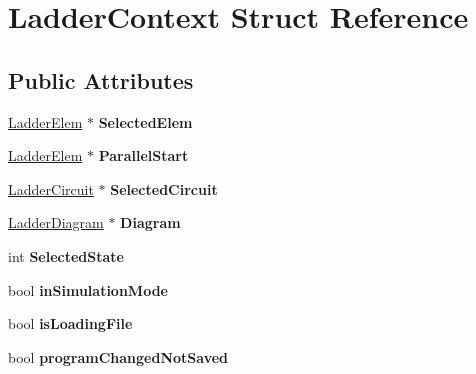 \hypertarget{struct_ladder_context}{\section{Ladder\-Context Struct Reference}
\label{struct_ladder_context}
}
\subsection*{Public Attributes}
\begin{DoxyCompactItemize}
\item 
\hypertarget{struct_ladder_context_a0cd153c6cd68ec58538fe16aa755a4d7}{\hyperlink{class_ladder_elem}{Ladder\-Elem} $\ast$ {\bfseries Selected\-Elem}}\label{struct_ladder_context_a0cd153c6cd68ec58538fe16aa755a4d7}

\item 
\hypertarget{struct_ladder_context_adc0388c67ea4f9faf3763beab150bb66}{\hyperlink{class_ladder_elem}{Ladder\-Elem} $\ast$ {\bfseries Parallel\-Start}}\label{struct_ladder_context_adc0388c67ea4f9faf3763beab150bb66}

\item 
\hypertarget{struct_ladder_context_a8f47cac2d6a04a4f916ef7dfcc13d590}{\hyperlink{class_ladder_circuit}{Ladder\-Circuit} $\ast$ {\bfseries Selected\-Circuit}}\label{struct_ladder_context_a8f47cac2d6a04a4f916ef7dfcc13d590}

\item 
\hypertarget{struct_ladder_context_aa484b4d3e6dd32cc400bafd4fc27a938}{\hyperlink{class_ladder_diagram}{Ladder\-Diagram} $\ast$ {\bfseries Diagram}}\label{struct_ladder_context_aa484b4d3e6dd32cc400bafd4fc27a938}

\item 
\hypertarget{struct_ladder_context_ad9ba831337ff7b352ecb27b8452e5070}{int {\bfseries Selected\-State}}\label{struct_ladder_context_ad9ba831337ff7b352ecb27b8452e5070}

\item 
\hypertarget{struct_ladder_context_acbf5282e19ef9c23c8bea6ad291fff17}{bool {\bfseries in\-Simulation\-Mode}}\label{struct_ladder_context_acbf5282e19ef9c23c8bea6ad291fff17}

\item 
\hypertarget{struct_ladder_context_a2d0003249005a9f7b1237df6b930cbc8}{bool {\bfseries is\-Loading\-File}}\label{struct_ladder_context_a2d0003249005a9f7b1237df6b930cbc8}

\item 
\hypertarget{struct_ladder_context_ab833f4f179657323127ccba8a79f770f}{bool {\bfseries program\-Changed\-Not\-Saved}}\label{struct_ladder_context_ab833f4f179657323127ccba8a79f770f}


\end{DoxyCompactItemize}
